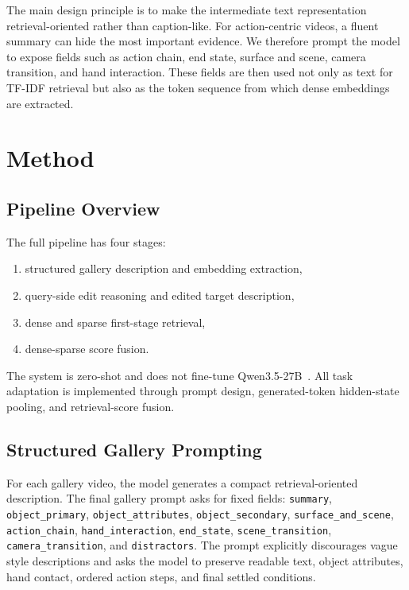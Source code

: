 \documentclass[10pt,twocolumn,letterpaper]{article}
\begin{document}
The main design principle is to make the intermediate text representation retrieval-oriented rather than caption-like.
For action-centric videos, a fluent summary can hide the most important evidence.
We therefore prompt the model to expose fields such as action chain, end state, surface and scene, camera transition, and hand interaction.
These fields are then used not only as text for TF-IDF retrieval but also as the token sequence from which dense embeddings are extracted.

\section{Method}

\subsection{Pipeline Overview}

The full pipeline has four stages:

\begin{enumerate}
    \item structured gallery description and embedding extraction,
    \item query-side edit reasoning and edited target description,
    \item dense and sparse first-stage retrieval,
    \item dense-sparse score fusion.
\end{enumerate}

The system is zero-shot and does not fine-tune Qwen3.5-27B~\cite{qwen35_27b}.
All task adaptation is implemented through prompt design, generated-token hidden-state pooling, and retrieval-score fusion.

\subsection{Structured Gallery Prompting}

For each gallery video, the model generates a compact retrieval-oriented description.
The final gallery prompt asks for fixed fields:
\texttt{summary}, \texttt{object\_primary}, \texttt{object\_attributes}, \texttt{object\_secondary}, \texttt{surface\_and\_scene}, \texttt{action\_chain}, \texttt{hand\_interaction}, \texttt{end\_state}, \texttt{scene\_transition}, \texttt{camera\_transition}, and \texttt{distractors}.
The prompt explicitly discourages vague style descriptions and asks the model to preserve readable text, object attributes, hand contact, ordered action steps, and final settled conditions.
\end{document}
